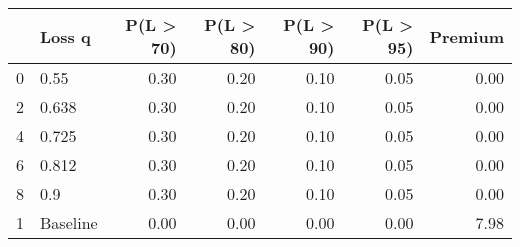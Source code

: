 \begin{tabular}{llrrrrr}
\toprule
{} &    Loss q &  P(L > 70) &  P(L > 80) &  P(L > 90) &  P(L > 95) &  Premium \\
\midrule
0 &      0.55 &       0.30 &       0.20 &       0.10 &       0.05 &     0.00 \\
2 &     0.638 &       0.30 &       0.20 &       0.10 &       0.05 &     0.00 \\
4 &     0.725 &       0.30 &       0.20 &       0.10 &       0.05 &     0.00 \\
6 &     0.812 &       0.30 &       0.20 &       0.10 &       0.05 &     0.00 \\
8 &       0.9 &       0.30 &       0.20 &       0.10 &       0.05 &     0.00 \\
1 &  Baseline &       0.00 &       0.00 &       0.00 &       0.00 &     7.98 \\
\bottomrule
\end{tabular}
